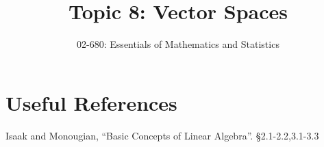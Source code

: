 


\title{Topic 8: Vector Spaces}
\author{02-680: Essentials of Mathematics and Statistics}


\maketitle



\section*{Useful References}
Isaak and Monougian, ``Basic Concepts of Linear Algebra''. \S 2.1-2.2,3.1-3.3\\

